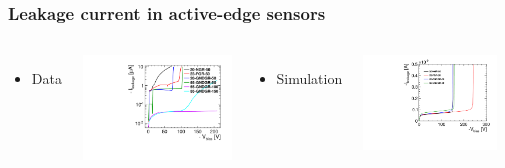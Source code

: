 \begin{frame}
  \frametitle{Leakage current in active-edge sensors}

  \begin{columns}
    \begin{itemize}
    \item Data
    \end{itemize}
    \centering
    \includegraphics[width=\textwidth]{../figures/ActiveEdge/IVCurve.pdf}


    \vspace{-0.2cm}
    \begin{itemize}
    \item Simulation
    \end{itemize}
    \centering
    \includegraphics[width=0.9\textwidth]{../figures/ActiveEdge/IVCurve_TCAD_50_micron.pdf}
    \\


\end{columns}
\end{frame}
